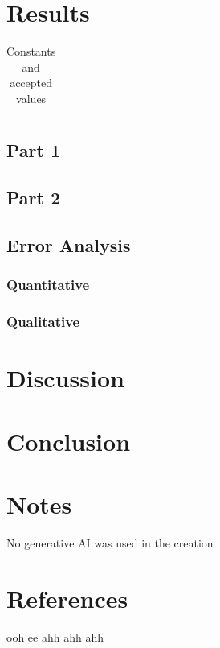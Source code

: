 \documentclass{article}[12pt]
\begin{document}
    \section{Results}
        \begin{table}[!ht]
            \centering
            \begin{tabular}[center]{|c|c|c|c|}

            \end{tabular}
            \caption{Constants and accepted values}\label{constants}
        \end{table}
        \subsection{Part 1}

        \subsection{Part 2}
            
        \subsection{Error Analysis}
            \subsubsection{Quantitative}
                
            \subsubsection{Qualitative}
            
    \section{Discussion}
       
    \section{Conclusion}
        
    \section*{Notes}
        No generative AI was used in the creation
    \section*{References}
        \begin{enumerate}[label={[\arabic*]}]
            \item \label{OriginalPaper} ooh ee ahh ahh ahh
        \end{enumerate}
\end{document}
